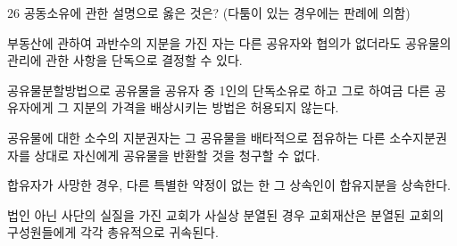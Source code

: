\begin{question}{26}
공동소유에 관한 설명으로 옳은 것은? (다툼이 있는 경우에는 판례에 의함)
\begin{choices}
  \item 부동산에 관하여 과반수의 지분을 가진 자는 다른 공유자와 협의가 없더라도 공유물의 관리에 관한 사항을 단독으로 결정할 수 있다.
  \item 공유물분할방법으로 공유물을 공유자 중 1인의 단독소유로 하고 그로 하여금 다른 공유자에게 그 지분의 가격을 배상시키는 방법은 허용되지 않는다.
  \item 공유물에 대한 소수의 지분권자는 그 공유물을 배타적으로 점유하는 다른 소수지분권자를 상대로 자신에게 공유물을 반환할 것을 청구할 수 없다.
  \item 합유자가 사망한 경우, 다른 특별한 약정이 없는 한 그 상속인이 합유지분을 상속한다.
  \item 법인 아닌 사단의 실질을 가진 교회가 사실상 분열된 경우 교회재산은 분열된 교회의 구성원들에게 각각 총유적으로 귀속된다.
\end{choices}
\end{question}
